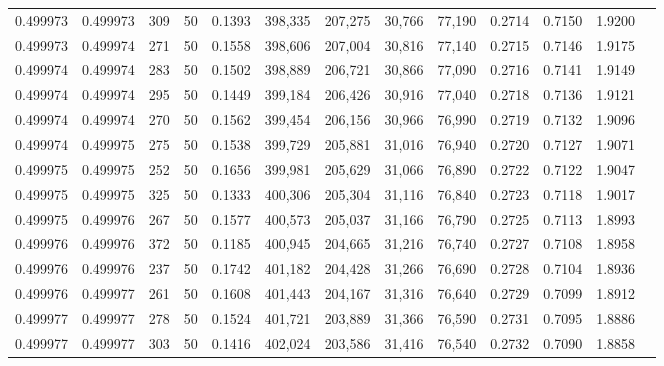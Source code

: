 \begin{tabular}{rrrrrrrrrrrrr}
0.499973 & 0.499973 &   309 &  50 &                                     0.1393 & 398,335 & 207,275 &  30,766 &  77,190 & 0.2714 & 0.7150 & 1.9200 \\
0.499973 & 0.499974 &   271 &  50 &                                     0.1558 & 398,606 & 207,004 &  30,816 &  77,140 & 0.2715 & 0.7146 & 1.9175 \\
0.499974 & 0.499974 &   283 &  50 &                                     0.1502 & 398,889 & 206,721 &  30,866 &  77,090 & 0.2716 & 0.7141 & 1.9149 \\
0.499974 & 0.499974 &   295 &  50 &                                     0.1449 & 399,184 & 206,426 &  30,916 &  77,040 & 0.2718 & 0.7136 & 1.9121 \\
0.499974 & 0.499974 &   270 &  50 &                                     0.1562 & 399,454 & 206,156 &  30,966 &  76,990 & 0.2719 & 0.7132 & 1.9096 \\
0.499974 & 0.499975 &   275 &  50 &                                     0.1538 & 399,729 & 205,881 &  31,016 &  76,940 & 0.2720 & 0.7127 & 1.9071 \\
0.499975 & 0.499975 &   252 &  50 &                                     0.1656 & 399,981 & 205,629 &  31,066 &  76,890 & 0.2722 & 0.7122 & 1.9047 \\
0.499975 & 0.499975 &   325 &  50 &                                     0.1333 & 400,306 & 205,304 &  31,116 &  76,840 & 0.2723 & 0.7118 & 1.9017 \\
0.499975 & 0.499976 &   267 &  50 &                                     0.1577 & 400,573 & 205,037 &  31,166 &  76,790 & 0.2725 & 0.7113 & 1.8993 \\
0.499976 & 0.499976 &   372 &  50 &                                     0.1185 & 400,945 & 204,665 &  31,216 &  76,740 & 0.2727 & 0.7108 & 1.8958 \\
0.499976 & 0.499976 &   237 &  50 &                                     0.1742 & 401,182 & 204,428 &  31,266 &  76,690 & 0.2728 & 0.7104 & 1.8936 \\
0.499976 & 0.499977 &   261 &  50 &                                     0.1608 & 401,443 & 204,167 &  31,316 &  76,640 & 0.2729 & 0.7099 & 1.8912 \\
0.499977 & 0.499977 &   278 &  50 &                                     0.1524 & 401,721 & 203,889 &  31,366 &  76,590 & 0.2731 & 0.7095 & 1.8886 \\
0.499977 & 0.499977 &   303 &  50 &                                     0.1416 & 402,024 & 203,586 &  31,416 &  76,540 & 0.2732 & 0.7090 & 1.8858 \\

\end{tabular}
